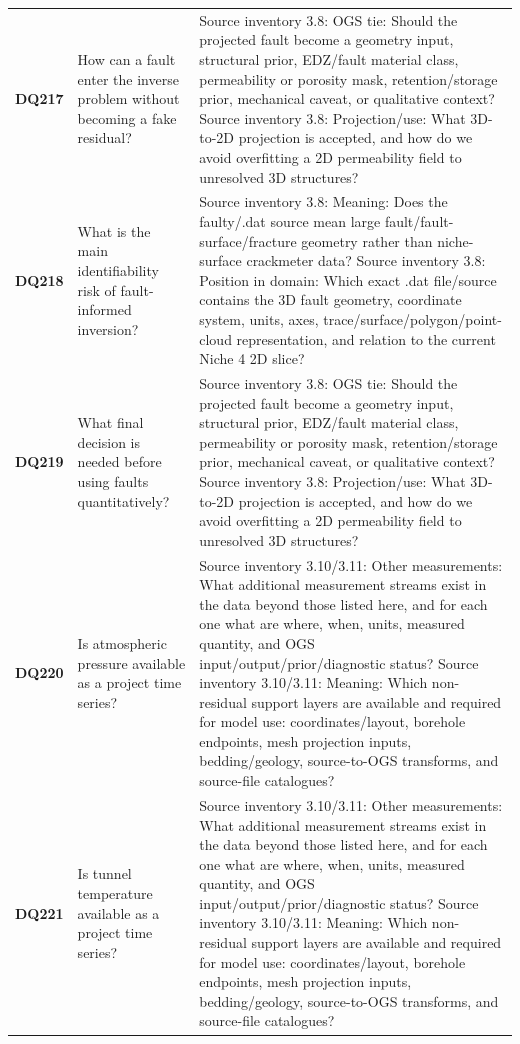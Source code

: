 \begin{longtable}{@{}L{0.09\textwidth} L{0.31\textwidth} L{0.52\textwidth}@{}}
\addlinespace[0.18em]
\textbf{DQ217} & How can a fault enter the inverse problem without becoming a fake residual? & Source inventory 3.8: OGS tie: Should the projected fault become a geometry input, structural prior, EDZ/fault material class, permeability or porosity mask, retention/storage prior, mechanical caveat, or qualitative context? Source inventory 3.8: Projection/use: What 3D-to-2D projection is accepted, and how do we avoid overfitting a 2D permeability field to unresolved 3D structures?\\
\addlinespace[0.18em]
\textbf{DQ218} & What is the main identifiability risk of fault-informed inversion? & Source inventory 3.8: Meaning: Does the faulty/.dat source mean large fault/fault-surface/fracture geometry rather than niche-surface crackmeter data? Source inventory 3.8: Position in domain: Which exact .dat file/source contains the 3D fault geometry, coordinate system, units, axes, trace/surface/polygon/point-cloud representation, and relation to the current Niche 4 2D slice?\\
\addlinespace[0.18em]
\textbf{DQ219} & What final decision is needed before using faults quantitatively? & Source inventory 3.8: OGS tie: Should the projected fault become a geometry input, structural prior, EDZ/fault material class, permeability or porosity mask, retention/storage prior, mechanical caveat, or qualitative context? Source inventory 3.8: Projection/use: What 3D-to-2D projection is accepted, and how do we avoid overfitting a 2D permeability field to unresolved 3D structures?\\
\addlinespace[0.18em]
\textbf{DQ220} & Is atmospheric pressure available as a project time series? & Source inventory 3.10/3.11: Other measurements: What additional measurement streams exist in the data beyond those listed here, and for each one what are where, when, units, measured quantity, and OGS input/output/prior/diagnostic status? Source inventory 3.10/3.11: Meaning: Which non-residual support layers are available and required for model use: coordinates/layout, borehole endpoints, mesh projection inputs, bedding/geology, source-to-OGS transforms, and source-file catalogues?\\
\addlinespace[0.18em]
\textbf{DQ221} & Is tunnel temperature available as a project time series? & Source inventory 3.10/3.11: Other measurements: What additional measurement streams exist in the data beyond those listed here, and for each one what are where, when, units, measured quantity, and OGS input/output/prior/diagnostic status? Source inventory 3.10/3.11: Meaning: Which non-residual support layers are available and required for model use: coordinates/layout, borehole endpoints, mesh projection inputs, bedding/geology, source-to-OGS transforms, and source-file catalogues?\\

\end{longtable}

